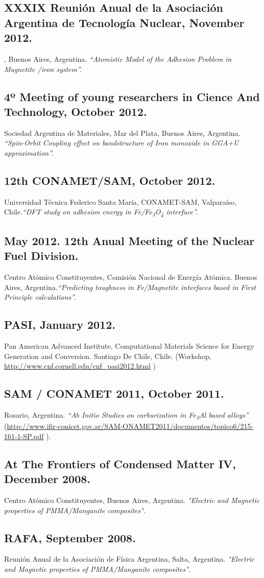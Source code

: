 \subsection{XXXIX Reunión Anual de la Asociación Argentina de Tecnología Nuclear, November 2012.}, Buenos Aires, Argentina.
\emph{ “Atomistic Model of the Adhesion Problem in Magnetite /iron system”. }

\subsection{4º Meeting of young researchers in Cience And Technology, October 2012.}Sociedad Argentina de Materiales, Mar del Plata, Buenos Aires, Argentina. \emph{  “Spin-Orbit Coupling effect on bandstructure of Iron monoxide in GGA+U approximation”. }

\subsection{12th CONAMET/SAM, October 2012.}  Universidad Técnica Federico Santa María, CONAMET-SAM, Valparaíso, Chile.\emph{“DFT study on adhesion energy in Fe/Fe\textsubscript{3}O\textsubscript{4} interface”.}

\subsection{May 2012. 12th Anual Meeting of the Nuclear Fuel Division.} Centro Atómico Constituyentes, Comisión Nacional de Energía Atómica. Buenos Aires, Argentina.\emph{“Predicting toughness in Fe/Magnetite interfaces based in First Principle calculations”.}

\subsection{PASI, January 2012.} Pan American Advanced Institute, Computational Materials Science for Energy Generation and Conversion. Santiago De Chile, Chile. (Workshop, \url{http://www.cnf.cornell.edu/cnf\_pasi2012.html} ) 

\subsection{SAM / CONAMET 2011, October 2011.}  Rosario, Argentina. \emph{“Ab Initio Studies on carburization in Fe\textsubscript{3}Al based alloys”} (\url{http://www.ifir-conicet.gov.ar/SAM-ONAMET2011/documentos/topico6/215-161-1-SP.pdf} ). 

\subsection{At The Frontiers of Condensed Matter IV, December 2008.} Centro Atómico Constituyentes, Buenos Aires, Argentina. \emph{"Electric and Magnetic properties of PMMA/Manganite composites". }

\subsection{RAFA, September 2008.} Reunión Anual de la Asociación de Física Argentina, Salta, Argentina. \emph{"Electric and Magnetic properties of PMMA/Manganite composites". }

